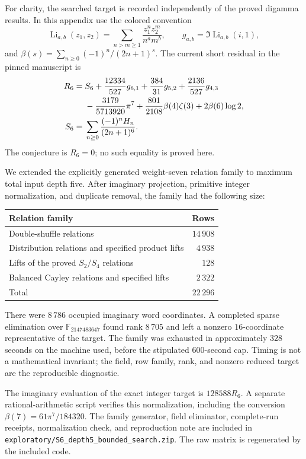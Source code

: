 \documentclass[11pt,a4paper]{article}
\numberwithin{equation}{section}
\theoremstyle{definition}
\theoremstyle{remark}
\DeclareMathOperator{\Li}{Li}
\begin{document}
For clarity, the searched target is recorded independently of the
proved digamma results.  In this appendix use the colored convention
\[
 \Li_{a,b}(z_1,z_2)=
       \sum_{n>m\ge1}\frac{z_1^nz_2^m}{n^am^b},\qquad
 g_{a,b}=\Im\Li_{a,b}(i,1),
\]
and $\beta(s)=\sum_{n\ge0}(-1)^n/(2n+1)^s$.
The current short residual in the pinned manuscript is
\begin{align}
 R_6={}&S_6+\frac{12334}{527}g_{6,1}
          +\frac{384}{31}g_{5,2}+\frac{2136}{527}g_{4,3}
 \notag\\
 &-\frac{3179}{5713920}\pi^7
     +\frac{801}{2108}\beta(4)\zeta(3)+2\beta(6)\log2,
 \label{eq:S6residual}\\
 S_6={}&\sum_{n\ge0}\frac{(-1)^nH_n}{(2n+1)^6}.
 \notag
\end{align}
The conjecture is $R_6=0$; no such equality is proved here.

We extended the explicitly generated weight-seven relation family
to maximum total input depth five.  After imaginary projection,
primitive integer normalization, and duplicate removal, the family
had the following size:
\begin{center}
\begin{tabular}{lr}
\toprule
Relation family & Rows\\
\midrule
Double-shuffle relations & $14\,908$\\
Distribution relations and specified product lifts & $4\,938$\\
Lifts of the proved $S_2/S_4$ relations & $128$\\
Balanced Cayley relations and specified lifts & $2\,322$\\
\midrule
Total & $22\,296$\\
\bottomrule
\end{tabular}
\end{center}
There were $8\,786$ occupied imaginary word coordinates.  A completed
sparse elimination over $\mathbb F_{2147483647}$ found rank
$8\,705$ and left a nonzero $16$-coordinate representative of the
target.  The family was exhausted in approximately $328$ seconds
on the machine used, before the stipulated $600$-second cap.
Timing is not a mathematical invariant; the field, row family,
rank, and nonzero reduced target are the reproducible diagnostic.

The imaginary evaluation of the exact integer target is $128588R_6$.
A separate rational-arithmetic script verifies this normalization,
including the conversion $\beta(7)=61\pi^7/184320$.
The family generator, field eliminator, complete-run receipts,
normalization check, and reproduction note are included in
\texttt{exploratory/S6\_depth5\_bounded\_search.zip}.
The raw matrix is regenerated by the included code.
\end{document}
